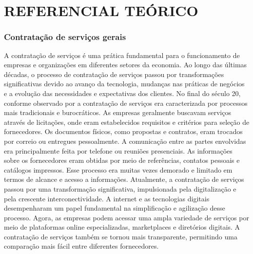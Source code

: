 \chapter{REFERENCIAL TEÓRICO}\label{cap:desenvolvimento}
\subsection{Contratação de serviços gerais}

A contratação de serviços é uma prática fundamental para o funcionamento de empresas e organizações em diferentes setores da economia. Ao longo das últimas décadas, o processo de contratação de serviços passou por transformações significativas devido ao avanço da tecnologia, mudanças nas práticas de negócios e a evolução das necessidades e expectativas dos clientes.
No final do século 20, conforme observado por \textcite{TheHiringProcess1994} a contratação de serviços era caracterizada por processos mais tradicionais e burocráticos. As empresas geralmente buscavam serviços através de licitações, onde eram estabelecidos requisitos e critérios para seleção de fornecedores. Os documentos físicos, como propostas e contratos, eram trocados por correio ou entregues pessoalmente. A comunicação entre as partes envolvidas era principalmente feita por telefone ou reuniões presenciais. As informações sobre os fornecedores eram obtidas por meio de referências, contatos pessoais e catálogos impressos. Esse processo era muitas vezes demorado e limitado em termos de alcance e acesso a informações.
Atualmente, a contratação de serviços passou por uma transformação significativa, impulsionada pela digitalização e pela crescente interconectividade. A internet e as tecnologias digitais desempenharam um papel fundamental na simplificação e agilização desse processo. Agora, as empresas podem acessar uma ampla variedade de serviços por meio de plataformas online especializadas, marketplaces e diretórios digitais. A contratação de serviços também se tornou mais transparente, permitindo uma comparação mais fácil entre diferentes fornecedores.


